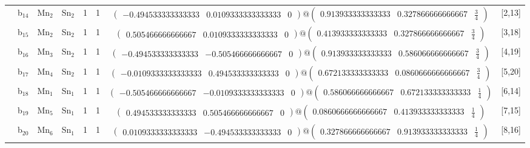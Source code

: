 \documentclass[fleqn,10pt,landscape]{article}
\begin{document}
\begin{itemize}
\begin{center}
\begin{longtable}{cc|cc|c|c|c|l}
& b$_{14}$ & Mn$_{2}$ & Sn$_{2}$ & 1 & 1 & $\begin{pmatrix} -0.494533333333333 & 0.0109333333333333 & 0 \end{pmatrix}@\begin{pmatrix} 0.913933333333333 & 0.327866666666667 & \frac{3}{4} \end{pmatrix}$ & [2,13] \\
& b$_{15}$ & Mn$_{2}$ & Sn$_{2}$ & 1 & 1 & $\begin{pmatrix} 0.505466666666667 & 0.0109333333333333 & 0 \end{pmatrix}@\begin{pmatrix} 0.413933333333333 & 0.327866666666667 & \frac{3}{4} \end{pmatrix}$ & [3,18] \\
& b$_{16}$ & Mn$_{3}$ & Sn$_{2}$ & 1 & 1 & $\begin{pmatrix} -0.494533333333333 & -0.505466666666667 & 0 \end{pmatrix}@\begin{pmatrix} 0.913933333333333 & 0.586066666666667 & \frac{3}{4} \end{pmatrix}$ & [4,19] \\
& b$_{17}$ & Mn$_{4}$ & Sn$_{2}$ & 1 & 1 & $\begin{pmatrix} -0.0109333333333333 & 0.494533333333333 & 0 \end{pmatrix}@\begin{pmatrix} 0.672133333333333 & 0.0860666666666667 & \frac{3}{4} \end{pmatrix}$ & [5,20] \\
& b$_{18}$ & Mn$_{1}$ & Sn$_{1}$ & 1 & 1 & $\begin{pmatrix} -0.505466666666667 & -0.0109333333333333 & 0 \end{pmatrix}@\begin{pmatrix} 0.586066666666667 & 0.672133333333333 & \frac{1}{4} \end{pmatrix}$ & [6,14] \\
& b$_{19}$ & Mn$_{5}$ & Sn$_{1}$ & 1 & 1 & $\begin{pmatrix} 0.494533333333333 & 0.505466666666667 & 0 \end{pmatrix}@\begin{pmatrix} 0.0860666666666667 & 0.413933333333333 & \frac{1}{4} \end{pmatrix}$ & [7,15] \\
& b$_{20}$ & Mn$_{6}$ & Sn$_{1}$ & 1 & 1 & $\begin{pmatrix} 0.0109333333333333 & -0.494533333333333 & 0 \end{pmatrix}@\begin{pmatrix} 0.327866666666667 & 0.913933333333333 & \frac{1}{4} \end{pmatrix}$ & [8,16] \\

\end{longtable}
\end{center}
\end{itemize}
\end{document}
